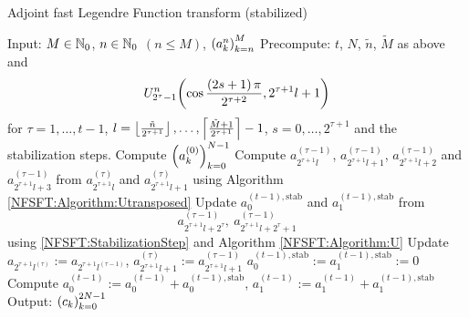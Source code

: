 \begin{algorithm}[htb]
  \caption{Adjoint fast Legendre Function transform (stabilized)}
  \label{NFSFT:Algorithm:adjointFLFT_stab}    
  \begin{algorithmic}
    \STATE Input:  $M \in \mathbb{N}_{0}$, $n \in \mathbb{N}_{0}$ $(n \le M)$, $\left(a_k^n\right)_{k=n}^{M}$
    \STATE Precompute: $t$, $N$, $\tilde{n}$, $\tilde{M}$ as above and \[U_{2^{\tau}-1}^{n}{\hspace{-0.4ex}}\left(\cos \frac{\left(2s+1\right)\pi}{2^{\tau+2}}, 2^{\tau+1}l+1\right)\] 
    \STATE {} for $\tau = 1,\ldots,t-1$, $l = \left\lfloor\frac{\tilde{n}}{2^{\tau+1}}\right\rfloor,\ldots,\left\lceil\frac{\tilde{M}+1}{2^{\tau+1}}\right\rceil-1$, 
    \STATE {} $s = 0,\ldots,2^{\tau+1}$ and the stabilization steps.
    \STATE Compute $\left(a_{k}^{(0)}\right)_{k=0}^{N-1}$ 
          \STATE Compute $a_{2^{\tau+1}l}^{(\tau-1)}$, $a_{2^{\tau+1}l+1}^{(\tau-1)}$, $a_{2^{\tau+1}l+2}^{(\tau-1)}$ and 
          $a_{2^{\tau+1}l+3}^{(\tau-1)}$ from $a_{2^{\tau+1}l}^{(\tau)}$ and $a_{2^{\tau+1}l+1}^{(\tau)}$ using 
          Algorithm \ref{NFSFT:Algorithm:Utransposed}
        \ELSE
          \STATE Update $a_{0}^{(t-1),\text{stab}}$ and $a_{1}^{(t-1),\text{stab}}$ from
            \[ 
              a_{2^{\tau+1}l+2^{\tau}}^{(\tau-1)},\ a_{2^{\tau+1}l+2^{\tau}+1}^{(\tau-1)}
            \] 
            using \eqref{NFSFT:StabilizationStep} and Algorithm \ref{NFSFT:Algorithm:U}
          \STATE Update $a_{2^{\tau+1}l^{(\tau)}} := a_{2^{\tau+1}l^{(\tau-1)}}$, $a_{2^{\tau+1}l+1}^{(\tau)} := a_{2^{\tau+1}l+1}^{(\tau-1)}$
        \ENDIF
      \ENDFOR
    \ENDFOR
    \STATE $a_{0}^{(t-1),\text{stab}} := a_{1}^{(t-1),\text{stab}} := 0$
    \STATE Compute $a_{0}^{(t-1)} := a_{0}^{(t-1)} + a_{0}^{(t-1),\text{stab}}$, $a_{1}^{(t-1)} := a_{1}^{(t-1)} + a_{1}^{(t-1),\text{stab}}$
    \STATE Output: $\left(c_{k}\right)_{k=0}^{2N-1}$
\end{algorithmic}
\end{algorithm}


%

\newcommand{\aknGraph}
{
  \begin{pgfscope}
    \color{gray}
 	  \pgfmoveto{\pgfxy(3.00,3.00)} 
    \pgflineto{\pgfxy(5.00,5.00)} 
    \pgflineto{\pgfxy(5.00,1.00)} 
    \pgfclip 
    \color{gray}
    \pgfrect[fill]{\pgfxy(3.00,1.00)}{\pgfxy(5.00,5.00)} 
  \end{pgfscope}
  \color{black}
  \faxes{0.00}{0.00}{6.00}{6.00}{0.2}{0.2}{$k$}{$n$}
  \ftriangle{3.00}{3.00}{0.25}{0.25}{9}{0.05cm}
}

